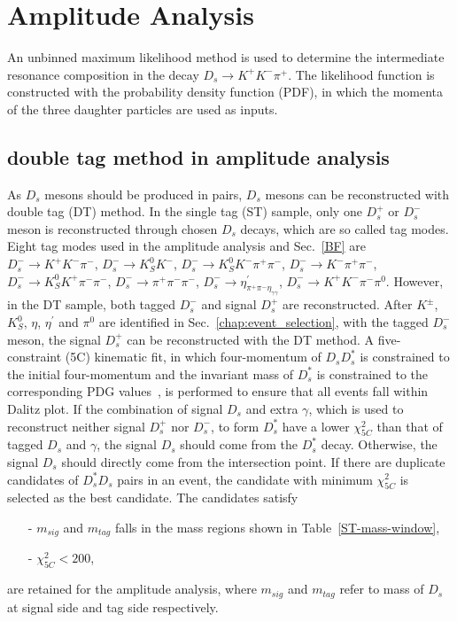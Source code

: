 \documentclass[aps,prd,twocolumn,showpacs,amsmath,amssymb]{revtex4-1}
\begin{document}
\section{Amplitude Analysis}
\label{AA}

An unbinned maximum likelihood method is used to determine the intermediate resonance composition in the decay $D_{s} \rightarrow K^{+}K^{-}\pi^{+}$.
The likelihood function is constructed with the probability density function (PDF), in which the momenta of the three daughter particles are used as inputs.

\subsection{double tag method in amplitude analysis}
\label{DT-AA}
As $D_{s}$ mesons should be produced in pairs, $D_{s}$ mesons can be reconstructed with double tag (DT) method.
In the single tag (ST) sample, only one $D_{s}^{+}$ or $D_{s}^{-}$ meson is reconstructed through chosen $D_{s}$ decays, which are so called tag modes.
Eight tag modes used in the amplitude analysis and Sec.~\ref{BF} are  
$D_{s}^{-} \rightarrow K^{+}K^{-}\pi^{-}$, $D_{s}^{-} \rightarrow K_{S}^{0}K^{-}$, $D_{s}^{-} \rightarrow K_{S}^{0}K^{-}\pi^{+}\pi^{-}$, $D_{s}^{-} \rightarrow K^{-}\pi^{+}\pi^{-}$, $D_{s}^{-} \rightarrow K_{S}^{0}K^{+}\pi^{-}\pi^{-}$, $D_{s}^{-} \rightarrow \pi^{+}\pi^{-}\pi^{-}$, $D_{s}^{-} \rightarrow \eta^{'}_{\pi^{+}\pi^{-}\eta_{\gamma\gamma}}$, $D_{s}^{-} \rightarrow K^{+}K^{-}\pi^{-}\pi^{0}$.
However, in the DT sample, both tagged $D_{s}^{-}$ and signal $D_{s}^{+}$ are reconstructed.
After $K^{\pm}$, $K_{S}^{0}$, $\eta$, $\eta^{'}$ and $\pi^{0}$ are identified in Sec.~\ref{chap:event_selection}, with the tagged $D_{s}^{-}$ meson, the signal $D_{s}^{+}$ can be reconstructed with the DT method.
A five-constraint (5C) kinematic fit, in which four-momentum of $D_{s}D_{s}^{*}$ is constrained to the initial four-momentum and the invariant mass of $D_{s}^{*}$ is constrained to the corresponding PDG values~\cite{PDG}, is performed to ensure that all events fall within Dalitz plot. 
If the combination of signal $D_{s}$ and extra $\gamma$, which is used to reconstruct neither signal $D_{s}^{+}$ nor $D_{s}^{-}$, to form $D_{s}^{*}$ have a lower $\chi_{5C}^{2}$ than that of tagged $D_{s}$ and $\gamma$, the signal $D_{s}$ should come from the $D_{s}^{*}$ decay.
Otherwise, the signal $D_{s}$ should directly come from the intersection point.
If there are duplicate candidates of $D_{s}^{*}D_{s}$ pairs in an event, the candidate with minimum $\chi_{5C}^{2}$ is selected as the best candidate.
The candidates satisfy
\begin{itemize}
    \item[-] $m_{sig}$ and $m_{tag}$ falls in the mass regions shown in Table~\ref{ST-mass-window}, 
	\item[-] $\chi_{5C}^{2} < 200 $, 
\end{itemize}
are retained for the amplitude analysis, where $m_{sig}$ and $m_{tag}$ refer to mass of $D_{s}$ at signal side and tag side respectively.
\end{document}
